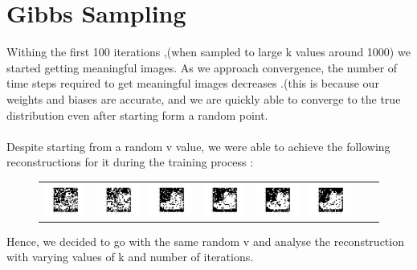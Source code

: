 \documentclass[12pt]{report}
\begin{document}
\section{Gibbs Sampling}
Withing the first 100 iterations ,(when sampled to large k values around 1000) we started getting meaningful images. As we approach convergence, the number of time steps required to get meaningful images decreases .(this is because our weights and biases are accurate, and we are quickly able to converge to the true distribution even after starting form a random point.\\\\
Despite starting from a random v value, we were able to achieve the following reconstructions for it during the training process :
\begin{figure}[H]
\begin{tabular}{cccccccc}
  \includegraphics[width=0.15\linewidth]{q3_1.png} &   \includegraphics[width=0.15\linewidth]{q3_2.png} &
  \includegraphics[width=0.15\linewidth]{q3_3.png} &   \includegraphics[width=0.15\linewidth]{q3_4.png} &
  \includegraphics[width=0.15\linewidth]{q3_5.png} &   \includegraphics[width=0.15\linewidth]{q3_6.png} \\
\end{tabular}
\end{figure}
Hence, we decided to go with the same random v and analyse the reconstruction with varying values of k and number of iterations.
\end{document}
